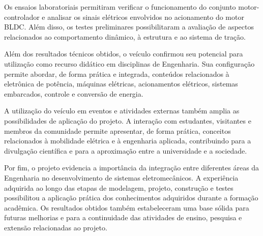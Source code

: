 \documentclass[conference]{IEEEtran}
\begin{document}
Os ensaios laboratoriais permitiram verificar o funcionamento do conjunto motor-controlador e analisar os sinais elétricos envolvidos no acionamento do motor BLDC. Além disso, os testes preliminares possibilitaram a avaliação de aspectos relacionados ao comportamento dinâmico, à estrutura e ao sistema de tração.

Além dos resultados técnicos obtidos, o veículo confirmou seu potencial para utilização como recurso didático em disciplinas de Engenharia. Sua configuração permite abordar, de forma prática e integrada, conteúdos relacionados à eletrônica de potência, máquinas elétricas, acionamentos elétricos, sistemas embarcados, controle e conversão de energia.

A utilização do veículo em eventos e atividades externas também amplia as possibilidades de aplicação do projeto. A interação com estudantes, visitantes e membros da comunidade permite apresentar, de forma prática, conceitos relacionados à mobilidade elétrica e à engenharia aplicada, contribuindo para a divulgação científica e para a aproximação entre a universidade e a sociedade.

Por fim, o projeto evidencia a importância da integração entre diferentes áreas da Engenharia no desenvolvimento de sistemas eletromecânicos. A experiência adquirida ao longo das etapas de modelagem, projeto, construção e testes possibilitou a aplicação prática dos conhecimentos adquiridos durante a formação acadêmica. Os resultados obtidos também estabeleceram uma base sólida para futuras melhorias e para a continuidade das atividades de ensino, pesquisa e extensão relacionadas ao projeto.
\end{document}

